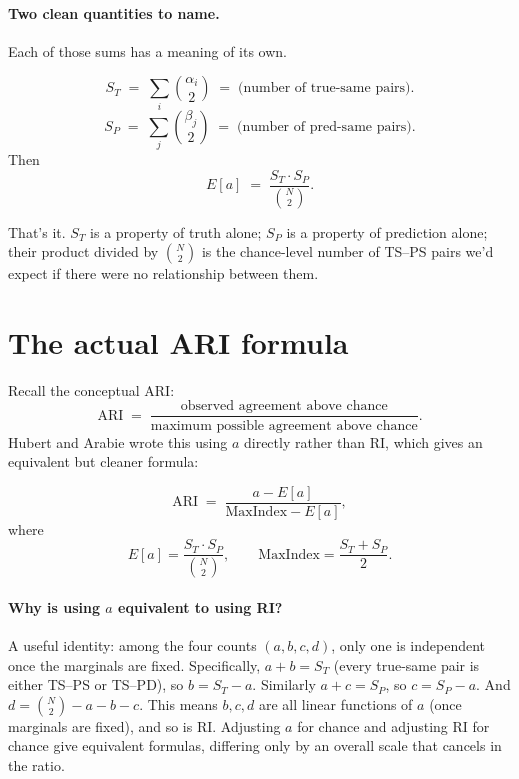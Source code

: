 \documentclass[11pt]{article}
\begin{document}
\paragraph{Two clean quantities to name.}
Each of those sums has a meaning of its own.

\begin{keybox}
\[
  S_T \;=\; \sum_{i} \binom{\alpha_i}{2}
  \;=\; \text{(number of true-same pairs)}.
\]
\[
  S_P \;=\; \sum_{j} \binom{\beta_j}{2}
  \;=\; \text{(number of pred-same pairs)}.
\]
Then
\[
  E[a] \;=\; \frac{S_T \cdot S_P}{\binom{N}{2}}.
\]
\end{keybox}

That's it. $S_T$ is a property of truth alone; $S_P$ is a property of
prediction alone; their product divided by $\binom{N}{2}$ is the
chance-level number of TS--PS pairs we'd expect if there were no
relationship between them.

\section{The actual ARI formula}

Recall the conceptual ARI:
\[
  \text{ARI} \;=\; \frac{\text{observed agreement above chance}}
                       {\text{maximum possible agreement above chance}}.
\]
Hubert and Arabie wrote this using $a$ directly rather than RI, which
gives an equivalent but cleaner formula:

\begin{keybox}[title={Hubert--Arabie ARI}]
\[
  \text{ARI} \;=\; \frac{a - E[a]}{\mathrm{MaxIndex} - E[a]},
\]
where
\[
  E[a] = \frac{S_T \cdot S_P}{\binom{N}{2}}, \qquad
  \mathrm{MaxIndex} = \frac{S_T + S_P}{2}.
\]
\end{keybox}

\paragraph{Why is using $a$ equivalent to using RI?}
A useful identity: among the four counts $(a, b, c, d)$, only one is
independent once the marginals are fixed. Specifically, $a + b = S_T$
(every true-same pair is either TS--PS or TS--PD), so $b = S_T - a$.
Similarly $a + c = S_P$, so $c = S_P - a$. And $d = \binom{N}{2} - a - b - c$.
This means $b, c, d$ are all linear functions of $a$ (once marginals are
fixed), and so is RI. Adjusting $a$ for chance and adjusting RI for chance
give equivalent formulas, differing only by an overall scale that cancels
in the ratio.
\end{document}
